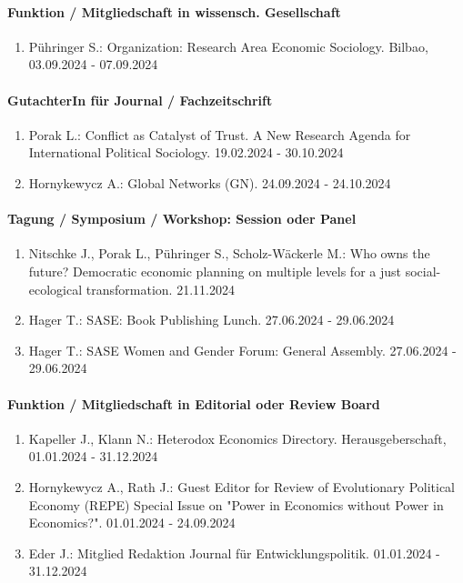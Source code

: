 \paragraph{Funktion / Mitgliedschaft in wissensch. Gesellschaft}
\begin{enumerate}[leftmargin=*, labelsep=0.5cm]
\item Pühringer S.: Organization: Research Area Economic Sociology. Bilbao, 03.09.2024 - 07.09.2024
\end{enumerate}
\paragraph{GutachterIn für Journal / Fachzeitschrift}
\begin{enumerate}[leftmargin=*, labelsep=0.5cm]
\item Porak L.: Conflict as Catalyst of Trust. A New Research Agenda for International Political Sociology. 19.02.2024 - 30.10.2024
\item Hornykewycz A.: Global Networks (GN). 24.09.2024 - 24.10.2024
\end{enumerate}
\paragraph{Tagung / Symposium / Workshop: Session oder Panel}
\begin{enumerate}[leftmargin=*, labelsep=0.5cm]
\item Nitschke J., Porak L., Pühringer S., Scholz-Wäckerle M.: Who owns the future? Democratic economic planning on multiple levels for a just social-ecological transformation. 21.11.2024
\item Hager T.: SASE: Book Publishing Lunch. 27.06.2024 - 29.06.2024
\item Hager T.: SASE Women and Gender Forum: General Assembly. 27.06.2024 - 29.06.2024
\end{enumerate}
\paragraph{Funktion / Mitgliedschaft in Editorial oder Review Board}
\begin{enumerate}[leftmargin=*, labelsep=0.5cm]
\item Kapeller J., Klann N.: Heterodox Economics Directory. Herausgeberschaft, 01.01.2024 - 31.12.2024
\item Hornykewycz A., Rath J.: Guest Editor for Review of Evolutionary Political Economy (REPE) Special Issue on "Power in Economics without Power in Economics?". 01.01.2024 - 24.09.2024
\item Eder J.: Mitglied Redaktion Journal für Entwicklungspolitik. 01.01.2024 - 31.12.2024
\end{enumerate}

